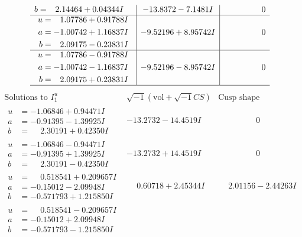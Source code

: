 \documentclass[1p]{elsarticle_modified}
\theoremstyle{definition}
\newcommand{\I}{\sqrt{-1}}
\begin{document}
$$\begin{array}{c|c|c}
\begin{aligned}
b &= \phantom{-}2.14464 + 0.04344 I\end{aligned}
 & -13.8372 - 7.1481 I & \phantom{-0.000000 } 0 \\ \hline\begin{aligned}
u &= \phantom{-}1.07786 + 0.91788 I \\
a &= -1.00742 + 1.16837 I \\
b &= \phantom{-}2.09175 - 0.23831 I\end{aligned}
 & -9.52196 + 8.95742 I & \phantom{-0.000000 } 0 \\ \hline\begin{aligned}
u &= \phantom{-}1.07786 - 0.91788 I \\
a &= -1.00742 - 1.16837 I \\
b &= \phantom{-}2.09175 + 0.23831 I\end{aligned}
 & -9.52196 - 8.95742 I & \phantom{-0.000000 } 0\\
 \hline 
 \end{array}$$\newpage$$\begin{array}{c|c|c}  
\text{Solutions to }I^u_{1}& \I (\text{vol} + \sqrt{-1}CS) & \text{Cusp shape}\\
 \hline 
\begin{aligned}
u &= -1.06846 + 0.94471 I \\
a &= -0.91395 - 1.39925 I \\
b &= \phantom{-}2.30191 + 0.42350 I\end{aligned}
 & -13.2732 - 14.4519 I & \phantom{-0.000000 } 0 \\ \hline\begin{aligned}
u &= -1.06846 - 0.94471 I \\
a &= -0.91395 + 1.39925 I \\
b &= \phantom{-}2.30191 - 0.42350 I\end{aligned}
 & -13.2732 + 14.4519 I & \phantom{-0.000000 } 0 \\ \hline\begin{aligned}
u &= \phantom{-}0.518541 + 0.209657 I \\
a &= -0.15012 - 2.09948 I \\
b &= -0.571793 + 1.215850 I\end{aligned}
 & \phantom{-}0.60718 + 2.45344 I & \phantom{-}2.01156 - 2.44263 I \\ \hline\begin{aligned}
u &= \phantom{-}0.518541 - 0.209657 I \\
a &= -0.15012 + 2.09948 I \\
b &= -0.571793 - 1.215850 I\end{aligned}

\end{array}$$
\end{document}

